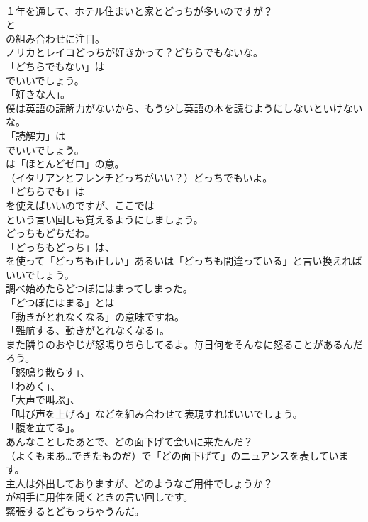 \documentclass[8pt]{extreport}
\begin{document}
\begin{CJK}{UTF8}{min}
\\	１年を通して、ホテル住まいと家とどっちが多いのですが？ 
\\	と
\\	の組み合わせに注目。	
\\	ノリカとレイコどっちが好きかって？どちらでもないな。 
\\	「どちらでもない」は
\\	でいいでしょう。
\\	「好きな人」。	
\\	僕は英語の読解力がないから、もう少し英語の本を読むようにしないといけないな。 
\\	「読解力」は 
\\	でいいでしょう。
\\	は「ほとんどゼロ」の意。	
\\	（イタリアンとフレンチどっちがいい？）どっちでもいよ。 
\\	「どちらでも」は
\\	を使えばいいのですが、ここでは
\\	という言い回しも覚えるようにしましょう。	
\\	どっちもどちだわ。 
\\	「どっちもどっち」は、
\\	を使って「どっちも正しい」あるいは「どっちも間違っている」と言い換えればいいでしょう。	
\\	調べ始めたらどつぼにはまってしまった。 
\\	「どつぼにはまる」とは
\\	「動きがとれなくなる」の意味ですね。
\\	「難航する、動きがとれなくなる」。	
\\	また隣りのおやじが怒鳴りちらしてるよ。毎日何をそんなに怒ることがあるんだろう。 
\\	「怒鳴り散らす」、
\\	「わめく」、
\\	「大声で叫ぶ」、
\\	「叫び声を上げる」などを組み合わせて表現すればいいでしょう。
\\	「腹を立てる」。	
\\	あんなことしたあとで、どの面下げて会いに来たんだ？ 
\\	（よくもまあ…できたものだ）で「どの面下げて」のニュアンスを表しています。	
\\	主人は外出しておりますが、どのようなご用件でしょうか？ 
\\	が相手に用件を聞くときの言い回しです。	
\\	緊張するとどもっちゃうんだ。 

\end{CJK}
\end{document}
